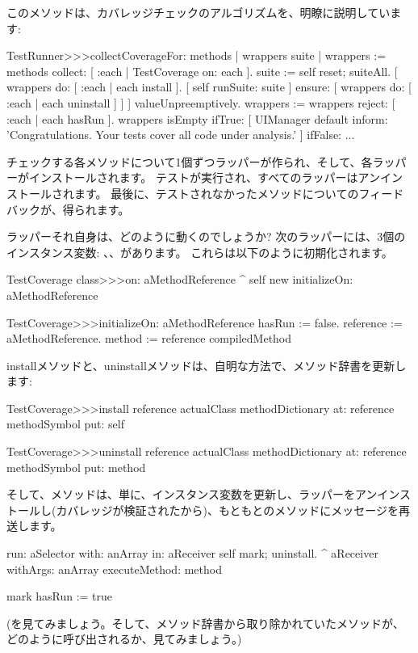 \documentclass[a4paper,10pt,twoside]{book}
\begin{document}
このメソッドは、カバレッジチェックのアルゴリズムを、明瞭に説明しています:
\begin{code}{}
TestRunner>>>collectCoverageFor: methods
	| wrappers suite |
	wrappers := methods collect: [ :each | TestCoverage on: each ].
	suite := self
		reset;
		suiteAll.
	[ wrappers do: [ :each | each install ].
	  [ self runSuite: suite ] ensure: [ wrappers do: [ :each | each uninstall ] ] ] valueUnpreemptively.
	wrappers := wrappers reject: [ :each | each hasRun ].
	wrappers isEmpty 
		ifTrue: 
			[ UIManager default inform: 'Congratulations. Your tests cover all code under analysis.' ]
		ifFalse: ...
\end{code}
チェックする各メソッドについて1個ずつラッパーが作られ、そして、各ラッパーがインストールされます。
テストが実行され、すべてのラッパーはアンインストールされます。
最後に、テストされなかったメソッドについてのフィードバックが、得られます。

ラッパーそれ自身は、どのように動くのでしょうか?
次のラッパーには、3個のインスタンス変数: 、、があります。
これらは以下のように初期化されます。
\begin{code}{}
TestCoverage class>>>on: aMethodReference
	^ self new initializeOn: aMethodReference

TestCoverage>>>initializeOn: aMethodReference
	hasRun := false.
	reference := aMethodReference.
	method := reference compiledMethod
\end{code}

installメソッドと、uninstallメソッドは、自明な方法で、メソッド辞書を更新します:
\begin{code}{}
TestCoverage>>>install
	reference actualClass methodDictionary
		at: reference methodSymbol
		put: self

TestCoverage>>>uninstall
	reference actualClass methodDictionary
		at: reference methodSymbol
		put: method
\end{code}
\noindent
そして、メソッドは、単に、インスタンス変数を更新し、ラッパーをアンインストールし(カバレッジが検証されたから)、もともとのメソッドにメッセージを再送します。
\begin{code}{}
run: aSelector with: anArray in: aReceiver
	self mark; uninstall.
	^ aReceiver withArgs: anArray executeMethod: method

mark
	hasRun := true
\end{code}
(を見てみましょう。そして、メソッド辞書から取り除かれていたメソッドが、どのように呼び出されるか、見てみましょう。)
\end{document}

